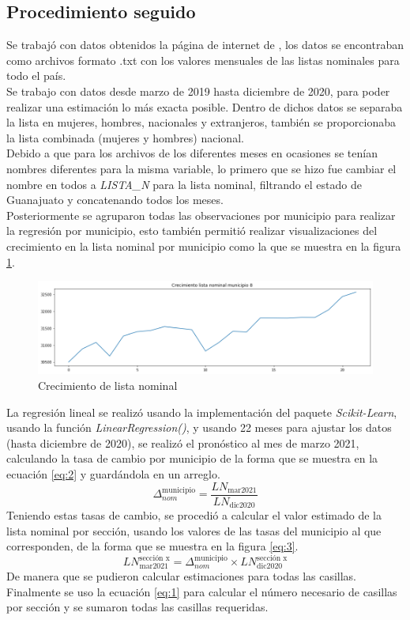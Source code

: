 \documentclass[12pt]{article}
\begin{document}
\subsection{Procedimiento seguido}
Se trabajó con datos obtenidos la página de internet de \cite{ine}, los datos se encontraban como archivos formato .txt con los valores mensuales de las listas nominales para todo el país. \\
Se trabajo con datos desde marzo de 2019 hasta diciembre de 2020, para poder realizar una estimación lo más exacta posible.
Dentro de dichos datos se separaba la lista en mujeres, hombres, nacionales y extranjeros, también se proporcionaba la lista combinada (mujeres y hombres) nacional. \\
Debido a que para los archivos de los diferentes meses en ocasiones se tenían nombres diferentes para la misma variable, lo primero que se hizo fue cambiar el nombre en todos a \textit{LISTA\_N} para la lista nominal, filtrando el estado de Guanajuato y concatenando todos los meses.\\
Posteriormente se agruparon todas las observaciones por municipio para realizar la regresión por municipio, esto también permitió realizar visualizaciones del crecimiento en la lista nominal por municipio como la que se muestra en la figura \ref{fig:1_1}.
\begin{figure}[H]
    \centering
    \includegraphics[width=0.7\linewidth]{images/1_1.png}
    \caption{Crecimiento de lista nominal}
    \label{fig:1_1}
\end{figure}
La regresión lineal se realizó usando la implementación del paquete \textit{Scikit-Learn}, usando la función \textit{LinearRegression()}, y usando 22 meses para ajustar los datos (hasta diciembre de 2020), se realizó el pronóstico al  mes de marzo 2021, calculando la tasa de cambio por municipio de la  forma que se muestra en la ecuación \ref{eq:2} y guardándola en un arreglo.
\begin{equation}
\Delta_{nom}^{\text{municipio}}=\frac{LN_{\text{mar2021}}}{LN_{\text{dic2020}}}
    \label{eq:2}
\end{equation}
Teniendo estas tasas de cambio, se procedió a calcular el valor estimado de  la lista nominal por sección, usando los valores de las tasas del municipio al que corresponden, de la forma que se muestra en la figura \ref{eq:3}.
\begin{equation}
LN_\text{mar2021}^{\text{sección x}}=\Delta_{nom}^{\text{municipio}}\times LN_{\text{dic2020}}^{\text{sección x}}
    \label{eq:3}
\end{equation}
De  manera que se pudieron calcular estimaciones para todas las casillas. Finalmente se uso la ecuación \ref{eq:1} para calcular el número necesario de casillas por sección y se sumaron todas las casillas requeridas.
\end{document}
